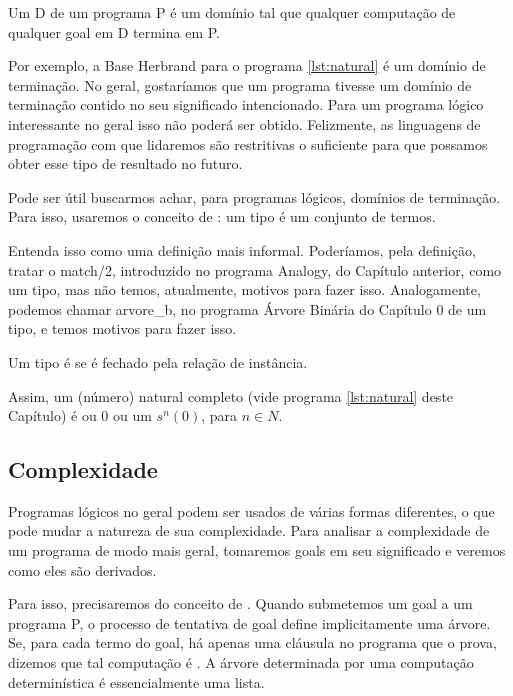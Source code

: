 \documentclass{article}
\begin{document}
\begin{definition}
  Um  D de um programa P é um domínio tal que qualquer computação de qualquer goal em D termina em P.
\end{definition}

Por exemplo, a Base Herbrand para o programa \ref{lst:natural} é um domínio de terminação.
No geral, gostaríamos que um programa tivesse um domínio de terminação contido no seu significado intencionado. Para um programa lógico interessante no geral isso não poderá ser obtido. Felizmente, as linguagens de programação com que lidaremos são restritivas o suficiente para que possamos obter esse tipo de resultado no futuro.

Pode ser útil buscarmos achar, para programas lógicos, domínios de terminação. Para isso, usaremos o conceito de : um tipo é um conjunto de termos.

Entenda isso como uma definição mais informal. Poderíamos, pela definição, tratar o match/2, introduzido no programa Analogy, do Capítulo anterior, como um tipo, mas não temos, atualmente, motivos para fazer isso.
Analogamente, podemos chamar arvore\_b, no programa Árvore Binária do Capítulo 0 de um tipo, %
e temos motivos para fazer isso.

\begin{definition} Um tipo é  se é fechado pela relação de instância.
\end{definition}

Assim, um (número) natural completo (vide programa \ref{lst:natural} deste Capítulo) é ou 0 ou um $s^n(0)$, para $n \in N$.

\subsection{Complexidade}

Programas lógicos no geral podem ser usados de várias formas diferentes, o que pode mudar a natureza de sua complexidade. Para analisar a complexidade de um programa de modo mais geral, tomaremos goals em seu significado e veremos como eles são derivados.

Para isso, precisaremos do conceito de . Quando submetemos um goal a um programa P, o processo de tentativa de goal define implicitamente uma árvore. Se, para cada termo do goal, há apenas uma cláusula no programa que o prova, dizemos que tal computação é . A árvore determinada por uma computação determinística é essencialmente uma lista.
\end{document}
